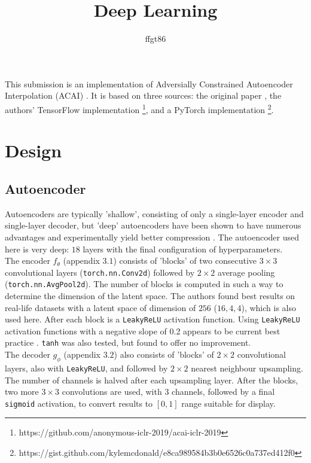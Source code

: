 \documentclass[11pt]{article} %
\title{Deep Learning}
\author{ffgt86}
\begin{document}
\maketitle

This submission is an implementation of Adversially Constrained Autoencoder Interpolation (ACAI) \cite{berthelot_et_al_2019}. It is based on three sources: the original paper \cite{berthelot_et_al_2019}, the authors' TensorFlow implementation \footnote{ https://github.com/anonymous-iclr-2019/acai-iclr-2019}, and a PyTorch implementation \footnote{https://gist.github.com/kylemcdonald/e8ca989584b3b0e6526c0a737ed412f0}.

\section{Design}

\subsection{Autoencoder}

Autoencoders are typically 'shallow', consisting of only a single-layer encoder and single-layer decoder, but 'deep' autoencoders have been shown to have numerous advantages \cite{goodfellow_et_al_2016} and experimentally yield better compression \cite{hinton_salakhutdinov_2006}. The autoencoder used here is very deep: $18$ layers with the final configuration of hyperparameters.\\

The encoder $f_\theta$ (appendix $3.1$) consists of 'blocks' of two consecutive $3 \times 3$ convolutional layers (\verb|torch.nn.Conv2d|) followed by $2 \times 2$ average pooling (\verb|torch.nn.AvgPool2d|). The number of blocks is computed in such a way to determine the dimension of the latent space. The authors found best results on real-life datasets with a latent space of dimension of $256$ ($16, 4, 4$), which is also used here. After each block is a \verb|LeakyReLU| activation function. Using \verb|LeakyReLU| activation functions with a negative slope of 0.2 appears to be current best practice \cite{bertholot_et_al_2019} \cite{heljakka_solin_kannala_2018}. \verb|tanh| was also tested, but found to offer no improvement.\\

The decoder $g_\phi$ (appendix $3.2$) also consists of 'blocks' of $2 \times 2$ convolutional layers, also with \verb|LeakyReLU|, and followed by $2 \times 2$ nearest neighbour upsampling. The number of channels is halved after each upsampling layer. After the blocks, two more $3 \times 3$ convolutions are used, with $3$ channels, followed by a final \verb|sigmoid| activation, to convert results to $[0, 1]$ range suitable for display.\\ 
\end{document}
